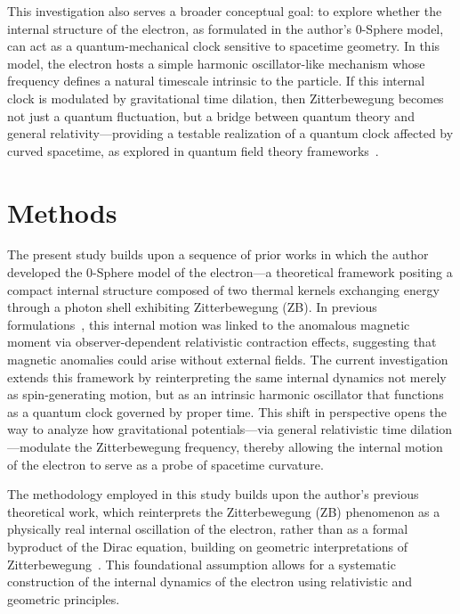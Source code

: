 \documentclass[%
 reprint,
 amsmath,amssymb,
 aps,
]{revtex4-1}
\numberwithin{equation}{section}%
\begin{document}
This investigation also serves a broader conceptual goal: to explore whether the internal structure of the electron, as formulated in the author's 0-Sphere model, can act as a quantum-mechanical clock sensitive to spacetime geometry. In this model, the electron hosts a simple harmonic oscillator-like mechanism whose frequency defines a natural timescale intrinsic to the particle. If this internal clock is modulated by gravitational time dilation, then Zitterbewegung becomes not just a quantum fluctuation, but a bridge between quantum theory and general relativity—providing a testable realization of a quantum clock affected by curved spacetime, as explored in quantum field theory frameworks~\cite{birrell1982}.


\section{Methods}

The present study builds upon a sequence of prior works in which the author developed the 0-Sphere model of the electron—a theoretical framework positing a compact internal structure composed of two thermal kernels exchanging energy through a photon shell exhibiting Zitterbewegung (ZB). In previous formulations~\cite{hanamura1811.0312, hanamura2411.0117, hanamura2006.0104, hanamura2309.0047, hanamura2501.0130}, this internal motion was linked to the anomalous magnetic moment via observer-dependent relativistic contraction effects, suggesting that magnetic anomalies could arise without external fields. The current investigation extends this framework by reinterpreting the same internal dynamics not merely as spin-generating motion, but as an intrinsic harmonic oscillator that functions as a quantum clock governed by proper time. This shift in perspective opens the way to analyze how gravitational potentials—via general relativistic time dilation—modulate the Zitterbewegung frequency, thereby allowing the internal motion of the electron to serve as a probe of spacetime curvature.

The methodology employed in this study builds upon the author's previous theoretical work, which reinterprets the Zitterbewegung (ZB) phenomenon as a physically real internal oscillation of the electron, rather than as a formal byproduct of the Dirac equation, building on geometric interpretations of Zitterbewegung~\cite{hestenes1990, barut1981}. This foundational assumption allows for a systematic construction of the internal dynamics of the electron using relativistic and geometric principles.
\end{document}
